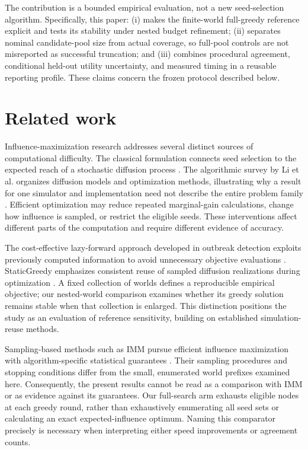\documentclass[smallextended]{svjour3}
\begin{document}
The contribution is a bounded empirical evaluation, not a new seed-selection algorithm. Specifically, this paper: (i) makes the finite-world full-greedy reference explicit and tests its stability under nested budget refinement; (ii) separates nominal candidate-pool size from actual coverage, so full-pool controls are not misreported as successful truncation; and (iii) combines procedural agreement, conditional held-out utility uncertainty, and measured timing in a reusable reporting profile. These claims concern the frozen protocol described below.


\section{Related work}

Influence-maximization research addresses several distinct sources of computational difficulty. The classical formulation connects seed selection to the expected reach of a stochastic diffusion process \cite{ref1}. The algorithmic survey by Li et al. organizes diffusion models and optimization methods, illustrating why a result for one simulator and implementation need not describe the entire problem family \cite{ref9}. Efficient optimization may reduce repeated marginal-gain calculations, change how influence is sampled, or restrict the eligible seeds. These interventions affect different parts of the computation and require different evidence of accuracy.

The cost-effective lazy-forward approach developed in outbreak detection exploits previously computed information to avoid unnecessary objective evaluations \cite{ref7}. StaticGreedy emphasizes consistent reuse of sampled diffusion realizations during optimization \cite{ref8}. A fixed collection of worlds defines a reproducible empirical objective; our nested-world comparison examines whether its greedy solution remains stable when that collection is enlarged. This distinction positions the study as an evaluation of reference sensitivity, building on established simulation-reuse methods.

Sampling-based methods such as IMM pursue efficient influence maximization with algorithm-specific statistical guarantees \cite{ref2}. Their sampling procedures and stopping conditions differ from the small, enumerated world prefixes examined here. Consequently, the present results cannot be read as a comparison with IMM or as evidence against its guarantees. Our full-search arm exhausts eligible nodes at each greedy round, rather than exhaustively enumerating all seed sets or calculating an exact expected-influence optimum. Naming this comparator precisely is necessary when interpreting either speed improvements or agreement counts.
\end{document}
